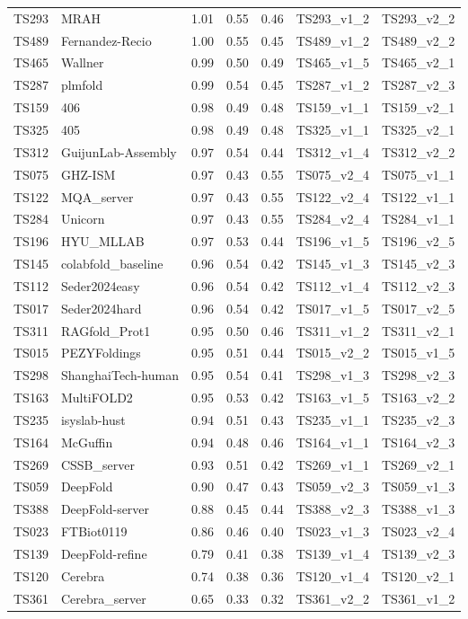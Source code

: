 \begin{table}[ht]
{\begin{tabular}{llrrrll}
TS293 & MRAH & 1.01 & 0.55 & 0.46 & TS293\_v1\_2 & TS293\_v2\_2 \\ 
TS489 & Fernandez-Recio & 1.00 & 0.55 & 0.45 & TS489\_v1\_2 & TS489\_v2\_2 \\ 
TS465 & Wallner & 0.99 & 0.50 & 0.49 & TS465\_v1\_5 & TS465\_v2\_1 \\ 
TS287 & plmfold & 0.99 & 0.54 & 0.45 & TS287\_v1\_2 & TS287\_v2\_3 \\ 
TS159 & 406 & 0.98 & 0.49 & 0.48 & TS159\_v1\_1 & TS159\_v2\_1 \\ 
TS325 & 405 & 0.98 & 0.49 & 0.48 & TS325\_v1\_1 & TS325\_v2\_1 \\ 
TS312 & GuijunLab-Assembly & 0.97 & 0.54 & 0.44 & TS312\_v1\_4 & TS312\_v2\_2 \\ 
TS075 & GHZ-ISM & 0.97 & 0.43 & 0.55 & TS075\_v2\_4 & TS075\_v1\_1 \\ 
TS122 & MQA\_server & 0.97 & 0.43 & 0.55 & TS122\_v2\_4 & TS122\_v1\_1 \\ 
TS284 & Unicorn & 0.97 & 0.43 & 0.55 & TS284\_v2\_4 & TS284\_v1\_1 \\ 
TS196 & HYU\_MLLAB & 0.97 & 0.53 & 0.44 & TS196\_v1\_5 & TS196\_v2\_5 \\ 
TS145 & colabfold\_baseline & 0.96 & 0.54 & 0.42 & TS145\_v1\_3 & TS145\_v2\_3 \\ 
TS112 & Seder2024easy & 0.96 & 0.54 & 0.42 & TS112\_v1\_4 & TS112\_v2\_3 \\ 
TS017 & Seder2024hard & 0.96 & 0.54 & 0.42 & TS017\_v1\_5 & TS017\_v2\_5 \\ 
TS311 & RAGfold\_Prot1 & 0.95 & 0.50 & 0.46 & TS311\_v1\_2 & TS311\_v2\_1 \\ 
TS015 & PEZYFoldings & 0.95 & 0.51 & 0.44 & TS015\_v2\_2 & TS015\_v1\_5 \\ 
TS298 & ShanghaiTech-human & 0.95 & 0.54 & 0.41 & TS298\_v1\_3 & TS298\_v2\_3 \\ 
TS163 & MultiFOLD2 & 0.95 & 0.53 & 0.42 & TS163\_v1\_5 & TS163\_v2\_2 \\ 
TS235 & isyslab-hust & 0.94 & 0.51 & 0.43 & TS235\_v1\_1 & TS235\_v2\_3 \\ 
TS164 & McGuffin & 0.94 & 0.48 & 0.46 & TS164\_v1\_1 & TS164\_v2\_3 \\ 
TS269 & CSSB\_server & 0.93 & 0.51 & 0.42 & TS269\_v1\_1 & TS269\_v2\_1 \\ 
TS059 & DeepFold & 0.90 & 0.47 & 0.43 & TS059\_v2\_3 & TS059\_v1\_3 \\ 
TS388 & DeepFold-server & 0.88 & 0.45 & 0.44 & TS388\_v2\_3 & TS388\_v1\_3 \\ 
TS023 & FTBiot0119 & 0.86 & 0.46 & 0.40 & TS023\_v1\_3 & TS023\_v2\_4 \\ 
TS139 & DeepFold-refine & 0.79 & 0.41 & 0.38 & TS139\_v1\_4 & TS139\_v2\_3 \\ 
TS120 & Cerebra & 0.74 & 0.38 & 0.36 & TS120\_v1\_4 & TS120\_v2\_1 \\ 
TS361 & Cerebra\_server & 0.65 & 0.33 & 0.32 & TS361\_v2\_2 & TS361\_v1\_2 \\ 
\bottomrule
\end{tabular}%
}
\end{table}
